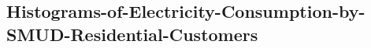 \subsection{Histograms-of-Electricity-Consumption-by-SMUD-Residential-Customers}
\label{Appendix:Chapter-1_Histograms-of-Electricity-Consumption-by-SMUD-Residential-Customers}
